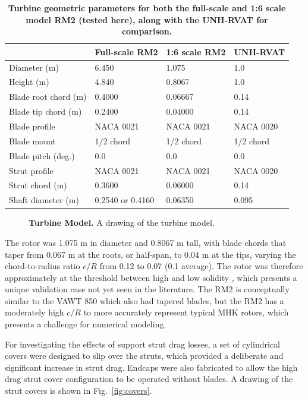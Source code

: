 \documentclass[10pt,letterpaper]{article}
\begin{document}
\begin{table}[ht]
\centering
\begin{tabular}{l|l|l|l}
   & Full-scale RM2 & 1:6 scale RM2 & UNH-RVAT \\
\hline
Diameter (m)   & 6.450 & 1.075 & 1.0 \\
Height (m)     & 4.840 & 0.8067 & 1.0 \\
Blade root chord (m) & 0.4000 & 0.06667 & 0.14 \\
Blade tip chord (m)  & 0.2400 & 0.04000 & 0.14 \\
Blade profile & NACA 0021 & NACA 0021 & NACA 0020 \\
Blade mount & 1/2 chord & 1/2 chord & 1/2 chord \\
Blade pitch (deg.) & 0.0 & 0.0 & 0.0 \\
Strut profile & NACA 0021 & NACA 0021 & NACA 0020 \\
Strut chord (m) & 0.3600 & 0.06000 & 0.14 \\
Shaft diameter (m) & 0.2540 \cite{Beam2011} or 0.4160 \cite{Hill2014} & 0.06350 & 0.095 \\
\end{tabular}
\caption{\textbf{Turbine geometric parameters for both the full-scale and 1:6
scale model RM2 (tested here), along with the UNH-RVAT for comparison.}}
\label{tab:turb-geom}
\end{table}

\begin{figure}[h]

    \caption{{\bf Turbine Model.} A drawing of the turbine model.}

    \label{fig:turbine-drawing}
\end{figure}

The rotor was 1.075 m in diameter and 0.8067 m tall, with blade chords that
taper from 0.067 m at the roots, or half-span, to 0.04 m at the tips, varying
the chord-to-radius ratio $c/R$ from 0.12 to 0.07 (0.1 average). The rotor was
therefore approximately at the threshold between high and low solidity
\cite{Strickland1981,Fiedler2009}, which presents a unique validation case not
yet seen in the literature. The RM2 is conceptually similar to the VAWT 850
\cite{Mays1990} which also had tapered blades, but the RM2 has a moderately high
$c/R$ to more accurately represent typical MHK rotors, which presents a
challenge for numerical modeling.

For investigating the effects of support strut drag losses, a set of cylindrical
covers were designed to slip over the struts, which provided a deliberate and
significant increase in strut drag. Endcaps were also fabricated to allow the
high drag strut cover configuration to be operated without blades. A drawing of
the strut covers is shown in Fig.~\ref{fig:covers}.
\end{document}

